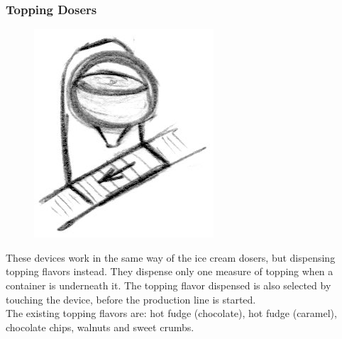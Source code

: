 \documentclass[a4paper]{scrartcl}
\begin{document}
        \subsubsection{Topping Dosers}
            \begin{minipage}[t][6em][t]{\textwidth}
                \begin{figure}
                    \vspace{-20pt}
                    \includegraphics[scale=1]{devices/topping_doser}
                    \vspace{-10pt}
                \end{figure}

                These devices work in the same way of the ice cream dosers, but dispensing topping flavors instead. They dispense only one measure of topping when a container is underneath it. The topping flavor dispensed is also selected by touching the device, before the production line is started.
                \\
                The existing topping flavors are: hot fudge (chocolate), hot fudge (caramel), chocolate chips, walnuts and sweet crumbs.
            \end{minipage}
\end{document}
